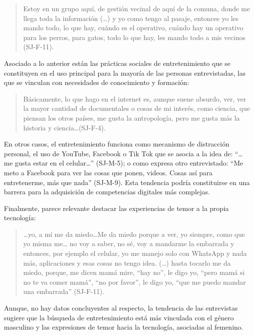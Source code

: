 \begin{quote}
	Estoy en un grupo aquí, de gestión vecinal de aquí de la comuna, donde
	me llega toda la información (\ldots) y yo como tengo al pasaje,
	entonces yo les mando todo, lo que hay, cuándo es el operativo, cuándo
	hay un operativo para los perros, para gatos, todo lo que hay, les mando
	todo a mis vecinos (SJ-F-11).
\end{quote}

Asociado a lo anterior están las prácticas sociales de entretenimiento
que se constituyen en el uso principal para la mayoría de las personas
entrevistadas, las que se vinculan con necesidades de conocimiento y
formación:

\begin{quote}
	Básicamente, lo que hago en el internet es, aunque suene absurdo, ver,
	ver la mayor cantidad de documentales o cosas de mi interés, como
	ciencia, que piensan los otros países, me gusta la antropología, pero me
	gusta más la historia y ciencia\ldots(SJ-F-4).
\end{quote}

En otros casos, el entretenimiento funciona como mecanismo de
distracción personal, el uso de YouTube, Facebook o Tik Tok que se
asocia a la idea de: \enquote{\ldots me gusta estar en el celular\ldots} (SJ-M-5); o
como expresa otro entrevistado: \enquote{Me meto a Facebook para ver las cosas
	que ponen, videos. Cosas así para entretenerme, más que nada} (SJ-M-9).
Esta tendencia podría constituirse en una barrera para la adquisición de
competencias digitales más complejas.

Finalmente, parece relevante destacar las experiencias de temor a la
propia tecnología:

\begin{quote}
	\ldots yo, a mí me da miedo\ldots Me da miedo porque a ver, yo siempre, como
	que yo misma me\ldots{} no voy a saber, no sé, voy a mandarme la
	embarrada y entonces, por ejemplo el celular, yo me manejo solo con
	WhatsApp y nada más, aplicaciones y esas cosas no tengo idea. (\ldots)
	hasta tocarlo me da miedo, porque, me dicen mamá mire, \enquote{hay no}, le
	digo yo, \enquote{pero mamá si no te va comer mamá}, \enquote{no por favor}, le digo
	yo, \enquote{que me puedo mandar una embarrada} (SJ-F-11).
\end{quote}

Aunque, no hay datos concluyentes al respecto, la tendencia de las
entrevistas sugiere que la búsqueda de entretenimiento está más
vinculada con el género masculino y las expresiones de temor hacia la
tecnología, asociadas al femenino.

